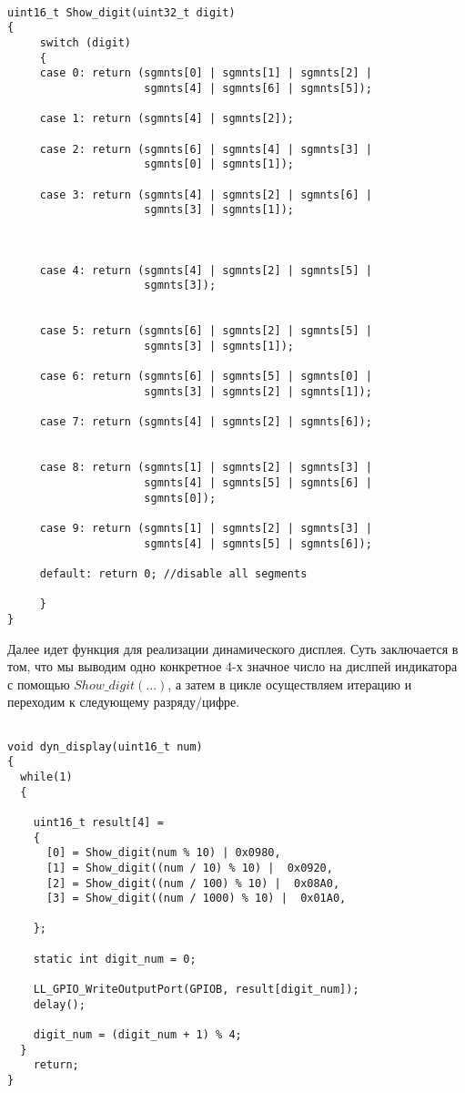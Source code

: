 \begin{verbatim}
    
uint16_t Show_digit(uint32_t digit)
{
     switch (digit)
     {
     case 0: return (sgmnts[0] | sgmnts[1] | sgmnts[2] |
                     sgmnts[4] | sgmnts[6] | sgmnts[5]);
             
     case 1: return (sgmnts[4] | sgmnts[2]);
     
     case 2: return (sgmnts[6] | sgmnts[4] | sgmnts[3] |
                     sgmnts[0] | sgmnts[1]);
             
     case 3: return (sgmnts[4] | sgmnts[2] | sgmnts[6] | 
                     sgmnts[3] | sgmnts[1]);
                     
     
  
     case 4: return (sgmnts[4] | sgmnts[2] | sgmnts[5] | 
                     sgmnts[3]);
             
             
     case 5: return (sgmnts[6] | sgmnts[2] | sgmnts[5] | 
                     sgmnts[3] | sgmnts[1]);
             
     case 6: return (sgmnts[6] | sgmnts[5] | sgmnts[0] |
                     sgmnts[3] | sgmnts[2] | sgmnts[1]);
             
     case 7: return (sgmnts[4] | sgmnts[2] | sgmnts[6]);
                     
             
     case 8: return (sgmnts[1] | sgmnts[2] | sgmnts[3] |
                     sgmnts[4] | sgmnts[5] | sgmnts[6] |
                     sgmnts[0]);
       
     case 9: return (sgmnts[1] | sgmnts[2] | sgmnts[3] |
                     sgmnts[4] | sgmnts[5] | sgmnts[6]);
             
     default: return 0; //disable all segments 
          
     }
}

\end{verbatim}

Далее идет функция для реализации динамического дисплея. Суть заключается в том, что мы выводим одно конкретное 4-х значное число на дислпей индикатора с помощью $Show\_digit(...)$, а затем в цикле осуществляем итерацию и переходим к следующему разряду/цифре.

\begin{verbatim}
    
void dyn_display(uint16_t num)
{
  while(1)
  {
  
    uint16_t result[4] = 
    {
      [0] = Show_digit(num % 10) | 0x0980,                         
      [1] = Show_digit((num / 10) % 10) |  0x0920,         
      [2] = Show_digit((num / 100) % 10) |  0x08A0,     
      [3] = Show_digit((num / 1000) % 10) |  0x01A0,        
  
    };
    
    static int digit_num = 0;
  
    LL_GPIO_WriteOutputPort(GPIOB, result[digit_num]); 
    delay();
    
    digit_num = (digit_num + 1) % 4;
  }
    return;
}

\end{verbatim}

